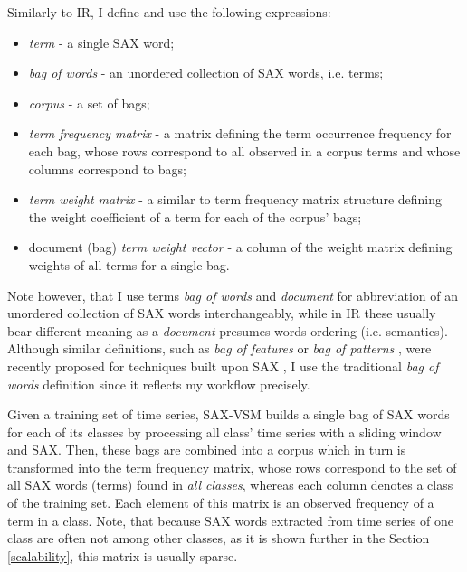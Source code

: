 Similarly to IR, I define and use the following expressions:
\begin{itemize}
  \item \textit{term} - a single SAX word;
  \item \textit{bag of words} - an unordered collection of SAX words, i.e. terms;
  \item \textit{corpus} - a set of bags;
  \item \textit{term frequency matrix} - a matrix defining the term occurrence frequency for each bag, 
  whose rows correspond to all observed in a corpus terms and whose columns correspond to bags;
  \item \textit{term weight matrix} - a similar to term frequency matrix structure defining the weight coefficient 
  of a term for each of the corpus' bags;
  \item document (bag) \textit{term weight vector} - a column of the weight matrix defining weights of all terms for a single bag.
\end{itemize}
Note however, that I use terms \textit{bag of words} and \textit{document} for abbreviation of an unordered 
collection of SAX words interchangeably, while in IR these usually bear different meaning as a \textit{document} 
presumes words ordering (i.e. semantics). 
Although similar definitions, such as \textit{bag of features} \cite{citeulike:12636726} 
or \textit{bag of patterns} \cite{citeulike:10525778}, were recently proposed for techniques built 
upon SAX \cite{citeulike:10525778}, I use the traditional \textit{bag of words} definition since it reflects 
my workflow precisely. 

Given a training set of time series, SAX-VSM builds a single bag of SAX words for each of its classes by 
processing all class' time series with a sliding window and SAX. Then, these bags are combined into a corpus 
which in turn is transformed into the term frequency matrix, whose rows correspond to the set of all SAX words (terms) 
found in \textit{all classes}, whereas each column denotes a class of the training set. 
Each element of this matrix is an observed frequency of a term in a class. 
Note, that because SAX words extracted from time series of one class are often not among other classes, 
as it is shown further in the Section \ref{scalability}, this matrix is usually sparse. 

